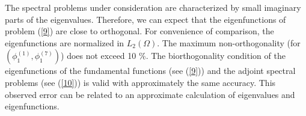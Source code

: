 \documentclass[a4paper]{jpconf}
\begin{document}
The spectral problems under consideration are characterized by small imaginary parts of the eigenvalues. Therefore, we can expect that the eigenfunctions of problem (\ref{9}) 
are close to orthogonal. 
For convenience of comparison, the eigenfunctions are normalized in $L_2(\Omega)$.
The maximum non-orthogonality (for $(\phi_1^{(1)}, \phi_1^{(7)})$)
does not exceed 10 \%.
The biorthogonality condition of the eigenfunctions of the fundamental functions (see (\ref{9})) and the adjoint spectral problems (see (\ref{10})) is valid with approximately the same accuracy.
This observed error can be related to an approximate calculation of eigenvalues and eigenfunctions.

\end{document}
